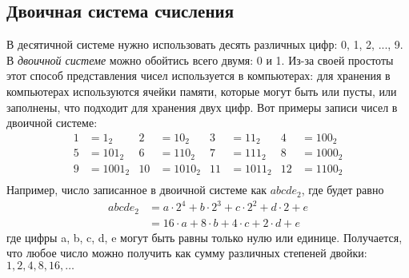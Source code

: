\documentclass[a4paper,12pt]{article}
\begin{document}
    \subsection{Двоичная система счисления}
    В десятичной системе нужно использовать десять различных цифр: 0, 1, 2, ..., 9.
    В \emph{двоичной системе} можно обойтись всего двумя: 0 и 1. Из-за своей простоты
    этот способ представления чисел используется в компьютерах: для хранения в 
    компьютерах используются ячейки памяти, которые могут быть или пусты, или 
    заполнены, что подходит для хранения двух цифр. Вот примеры записи чисел в 
    двоичной системе:
    \begin{align*}
        1 &= 1_2  &  2 &= 10_2  &  3 &= 11_2  &  4 &= 100_2 \\
        5 &= 101_2  &  6 &=  110_2 & 7 &= 111_2  &  8 &= 1000_2\\
        9 &= 1001_2  &  10 &= 1010_2  &  11 &= 1011_2  &  12 &= 1100_2\\    
    \end{align*}
    Например, число записанное в двоичной системе как $abcde_2$, где
    будет равно
    \begin{align*}
        abcde_2 &= a\cdot 2^4 + b\cdot 2^3 + c\cdot 2^2 + d\cdot 2 + e\\
                &= 16\cdot a + 8\cdot b + 4\cdot c + 2\cdot d + e
    \end{align*}
    где цифры a, b, c, d, e могут быть равны только нулю или единице.
    Получается, что любое число можно получить как сумму различных
    степеней двойки: $1, 2, 4, 8, 16, \ldots$ 
    
    
\end{document}
